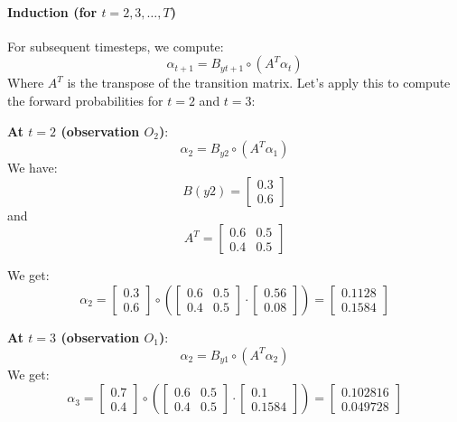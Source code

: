 \paragraph{Induction (for \( t = 2, 3, \dots, T \))}

  For subsequent timesteps, we compute:
  \[
  \alpha_{t+1} = B_{yt+1} \circ  (A^T \alpha_t)
  \]
  Where \( A^T \) is the transpose of the transition matrix. Let’s apply this to compute the forward probabilities for \( t = 2 \) and \( t = 3 \):

  \textbf{At \( t = 2 \) (observation \( O_2 \))}:
  \[
  \alpha_2 = B_{y2} \circ (A^T \alpha_1)
  \]
  We have:
  \[
  B(y2) = \begin{bmatrix} 0.3 \\ 0.6 \end{bmatrix}
  \]
  and 
  \[
  A^T = \begin{bmatrix} 0.6 & 0.5 \\ 0.4 & 0.5 \end{bmatrix} 
  \]

  We get:
  \[
  \alpha_2 = \begin{bmatrix} 0.3 \\ 0.6 \end{bmatrix} \circ \left(\begin{bmatrix} 0.6 & 0.5 \\ 0.4 & 0.5 \end{bmatrix} \cdot \begin{bmatrix} 0.56 \\ 0.08 \end{bmatrix}\right) = \begin{bmatrix} 0.1128 \\ 0.1584 \end{bmatrix}
  \]

  \textbf{At \( t = 3 \) (observation \( O_1 \))}:
  \[
  \alpha_2 = B_{y1} \circ (A^T \alpha_2)
  \]
  We get: 
  \[
  \alpha_3 = \begin{bmatrix} 0.7 \\ 0.4 \end{bmatrix} \circ \left( \begin{bmatrix} 0.6 & 0.5 \\ 0.4 & 0.5 \end{bmatrix} \cdot \begin{bmatrix} 0.1 \\ 0.1584 \end{bmatrix} \right)= \begin{bmatrix} 0.102816 \\ 0.049728 \end{bmatrix}
  \]

